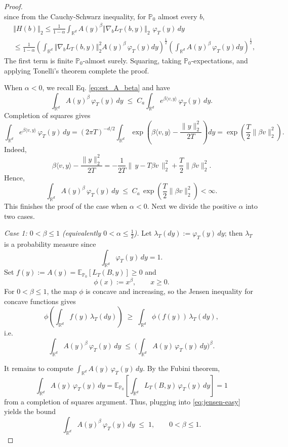 \documentclass[11pt]{article}
\theoremstyle{definition}
\newcommand{\R}{\mathbb{R}}
\newcommand{\E}{\mathbb{E}}
\begin{document}
\begin{proof}
\begin{equation}
\end{equation}since from the Cauchy-Schwarz inequality, for $\mathbb{P}_0$ almost every $b$,
\begin{align*}
    &\left\Vert H(b) \right\Vert_2 \leq \frac{1}{1-\alpha}\int_{\mathbb R^d}A(y)^{\beta}\left\Vert\nabla_b L_T(b,y)\right\Vert_2\,\,\varphi_T(y)\,dy\\
    &\leq \frac{1}{1-\alpha} \left(\int_{\mathbb{R}^d}\left\Vert\nabla_b L_T(b,y)\right\Vert_2^2A(y)^{\beta}\,\varphi_T(y)dy\right)^{\frac{1}{2}}\left(\int_{\mathbb{R}^d}A(y)^{\beta}\,\varphi_T(y)dy\right)^{\frac{1}{2}},
\end{align*}
{The first term is finite $\mathbb P_0$-almost surely. Squaring, taking
$\mathbb P_0$-expectations, and applying Tonelli's theorem complete the proof.}

When $\alpha < 0$, we recall Eq. \eqref{eq:est_A_beta} and have %
\[
\int_{\R^d} A(y)^{\beta}\,\varphi_T(y)\,dy
\;\le\;
C_a \int_{\R^d} e^{\beta\langle v,y\rangle}\,\varphi_T(y)\,dy.
\]
Completion of squares gives
\[
\int_{\R^d} e^{\beta\langle v,y\rangle}\,\varphi_T(y)\,dy
=(2\pi T)^{-d/2}\!\!\int_{\R^d}
\exp\!\left(\beta\langle v,y\rangle-\frac{\|y\|_2^2}{2T}\right)dy
=\exp\!\left(\frac{T}{2}\|\beta v\|_2^2\right).
\]
Indeed,
\[
\beta\langle v,y\rangle-\frac{\|y\|_2^2}{2T}
=-\frac{1}{2T}\Big\|\,y-T\beta v\,\Big\|_2^2+\frac{T}{2}\|\beta v\|_2^2.
\]
Hence, 
\[
\int_{\R^d} A(y)^{\beta}\,\varphi_T(y)\,dy
\;\le\;
C_a\,\exp\!\left(\frac{T}{2}\|\beta v\|_2^2\right)
<\infty.
\]
This finishes the proof of the case when $\alpha<0$.
Next we divide the positive $\alpha$ into two cases.

\noindent\emph{Case 1: $0<\beta\le 1$ (equivalently $0<\alpha\le \tfrac12$).}
Let $\lambda_T(dy):=\varphi_T(y)\,dy$; then $\lambda_T$ is a probability measure since
\[
\int_{\R^d}\varphi_T(y)\,dy=1.
\]
Set $f(y):=A(y)=\E_{\mathbb P_0}[L_T(B,y)]\geq0$ and
\[
\phi(x):=x^{\beta},\qquad x\ge 0.
\]
For $0<\beta\le 1$, the map $\phi$ is concave and increasing, so the Jensen 
inequality for concave functions gives
\[
\phi\!\left(\int_{\R^d} f(y)\,\lambda_T(dy)\right)\;\ge\;\int_{\R^d}\phi(f(y))\,\lambda_T(dy),
\]
i.e.
\begin{equation}\label{eq:jensen-easy}
\int_{\R^d} A(y)^{\beta}\,\varphi_T(y)\,dy
\;\le\;
\Big(\int_{\R^d} A(y)\,\varphi_T(y)\,dy\Big)^{\beta}.
\end{equation}

It remains to compute $\int_{\R^d} A(y)\,\varphi_T(y)\,dy$. By the Fubini theorem,
\[
\int_{\R^d} A(y)\,\varphi_T(y)\,dy
=\E_{\mathbb{P}_0}\!\left[\int_{\R^d} L_T(B,y)\,\varphi_T(y)\,dy\right] = 1
\]
from a completion of squares argument. Thus, plugging into \eqref{eq:jensen-easy} yields the bound
\[\ \int_{\R^d} A(y)^{\beta}\,\varphi_T(y)\,dy \;\le\; 1,\qquad 0<\beta\le 1. \ 
\]


\end{proof}
\end{document}
